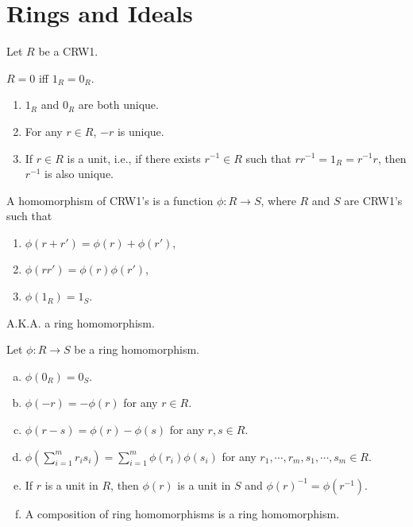 \chapter{Rings and Ideals}

Let $R$ be a CRW1.

\begin{fact}
    $R = 0$ iff $1_R = 0_R$.
\end{fact}

\begin{fact}
    \begin{enumerate}[(1)]
        \item $1_R$ and $0_R$ are both unique.
        \item For any $r \in R$, $-r$ is unique.
        \item If $r \in R$ is a unit, i.e., if there exists $r^{-1} \in R$ such that $rr^{-1} = 1_R = r^{-1}r$, then $r^{-1}$ is also unique.
    \end{enumerate}
\end{fact}

\begin{definition}
    A homomorphism of CRW1's is a function $\phi: R \to S$, where $R$ and $S$ are CRW1's such that 
    \begin{enumerate}[(1)]
        \item $\phi(r+r') = \phi(r) + \phi(r')$,
        \item $\phi(rr') = \phi(r) \phi(r')$,
        \item $\phi(1_R) = 1_S$.
    \end{enumerate}
    A.K.A. a ring homomorphism.
\end{definition}

\begin{fact}
    Let $\phi: R \to S$ be a ring homomorphism.
    \begin{enumerate}[(a)]
        \item $\phi(0_R) = 0_S$.
        \item $\phi(-r) = -\phi(r)$ for any $r \in R$.
        \item $\phi(r-s) = \phi(r) - \phi(s)$ for any $r,s \in R$.
        \item $\phi(\sum_{i=1}^mr_is_i) = \sum_{i=1}^m\phi(r_i)\phi(s_i)$ for any $r_1,\cdots,r_m,s_1,\cdots,s_m \in R$.
        \item If $r$ is a unit in $R$, then $\phi(r)$ is a unit in $S$ and $\phi(r)^{-1} = \phi(r^{-1})$.
        \item A composition of ring homomorphisms is a ring homomorphism.
    \end{enumerate}
\end{fact}

